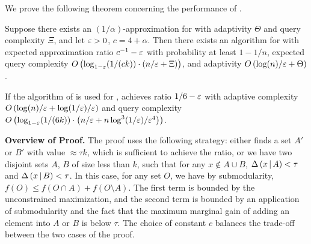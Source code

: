 We prove the following theorem concerning the performance of \atg.

\begin{theorem}
  \label{thm:atg}
  Suppose there exists an $(1/\alpha )$-approximation for
  \unc with adaptivity $\Theta$ and query complexity
  $\Xi$, and let $\varepsilon > 0$, $c = 4+\alpha$.
  Then there exists an algorithm for \sm with
  expected approximation ratio $c^{-1}-\varepsilon$ with probability
  at least $1 - 1/n$, expected query complexity
  $O\left(  \log_{1 - \varepsilon}(1/(ck)) \cdot \left( n / \varepsilon + \Xi \right)  \right)$,
  and adaptivity $O\left( \log( n) / \varepsilon + \Theta  \right)$.
\end{theorem}
\noindent If the algorithm of  is used for \unc,
\atg achieves ratio $1/6 - \varepsilon$
with adaptive complexity $O\left( \log( n) / \varepsilon + \log(1 / \varepsilon) / \varepsilon \right)$ 
and query complexity
$O \left( \log_{1 - \varepsilon}(1/(6k)) \cdot \left( n / \varepsilon + n \log^3(1 / \varepsilon) / \varepsilon^4 \right) \right)$.

\textbf{Overview of Proof.}
The proof uses the following strategy: either \threseq finds
a set $A'$ or $B'$ with value $\approx \tau k$,
which is sufficient to achieve the ratio, or we
have two disjoint sets $A$, $B$ of size less than
$k$, such that for any $x \not \in A \cup B$, $\Delta \left( x \, | \, A \right) < \tau$
and $\Delta \left( x \, | \, B \right) < \tau$. 
In this case, for any set $O$, we have
by submodularity, $f(O) \le f(O \cap A) + f(O \setminus A )$.
The first term is bounded by the unconstrained maximization, and
the second term is bounded by an application of submodularity and the
fact that the maximum marginal gain of adding an element into $A$ or $B$ is below $\tau$.
The choice of constant $c$ balances the trade-off between the two
cases of the proof. 

